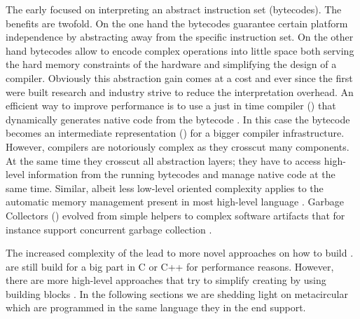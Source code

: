 The early \VMs focused on interpreting an abstract instruction set (bytecodes).
The benefits are twofold.
On the one hand the bytecodes guarantee certain platform independence by abstracting away from the \CPU specific instruction set.
On the other hand bytecodes allow to encode complex operations into little space both serving the hard memory constraints of the hardware and simplifying the design of a compiler.
Obviously this abstraction gain comes at a cost and ever since the first \VMs were built research and industry strive to reduce the interpretation overhead.
An efficient way to improve performance is to use a just in time compiler (\JIT) that dynamically generates native code from the bytecode \cite{??}.
In this case the bytecode becomes an intermediate representation (\IR) for a bigger compiler infrastructure.
However, \JIT compilers are notoriously complex as they crosscut many \VM components.
At the same time they crosscut all abstraction layers; they have to access high-level information from the running bytecodes and manage native code at the same time.
Similar, albeit less low-level oriented complexity applies to the automatic memory management present in most high-level language \VMs.
Garbage Collectors (\GC) evolved from simple helpers to complex software artifacts that for instance support concurrent garbage collection \cite{Clic05a}.

The increased complexity of the \VMs lead to more novel approaches on how to build \VMs.
\VMs are still build for a big part in C or C++ for performance reasons.
However, there are more high-level approaches that try to simplify creating \VMs by using building blocks \cite{Geof10a}.
In the following sections we are shedding light on metacircular \VMs which are programmed in the same language they in the end support.

